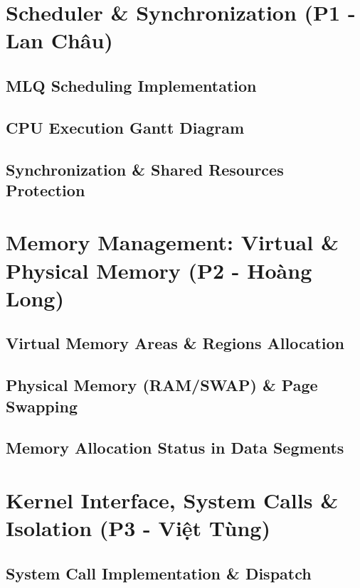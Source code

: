 \documentclass[11pt,a4paper]{article}
\begin{document}
\tableofcontents
\clearpage
{}
\hypersetup{pageanchor=true}

\section{Scheduler \& Synchronization (P1 - Lan Châu)}
\subsection{MLQ Scheduling Implementation}

\subsection{CPU Execution Gantt Diagram}

\subsection{Synchronization \& Shared Resources Protection}

\section{Memory Management: Virtual \& Physical Memory (P2 - Hoàng Long)}
\subsection{Virtual Memory Areas \& Regions Allocation}

\subsection{Physical Memory (RAM/SWAP) \& Page Swapping}

\subsection{Memory Allocation Status in Data Segments}

\section{Kernel Interface, System Calls \& Isolation (P3 - Việt Tùng)}
\subsection{System Call Implementation \& Dispatch}
\end{document}
